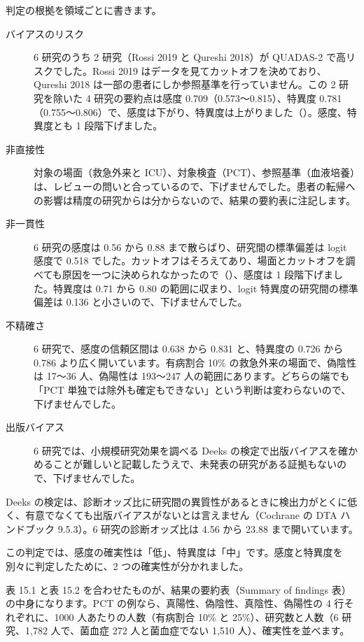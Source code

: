 判定の根拠を領域ごとに書きます。

\begin{description}
\item[バイアスのリスク] 6 研究のうち 2 研究（Rossi 2019 と Qureshi 2018）が QUADAS-2 で高リスクでした。Rossi 2019 はデータを見てカットオフを決めており、Qureshi 2018 は一部の患者にしか参照基準を行っていません。この 2 研究を除いた 4 研究の要約点は感度 0.709（0.573〜0.815）、特異度 0.781（0.755〜0.806）で、感度は下がり、特異度は上がりました（）。感度、特異度とも 1 段階下げました。
\item[非直接性] 対象の場面（救急外来と ICU）、対象検査（PCT）、参照基準（血液培養）は、レビューの問いと合っているので、下げませんでした。患者の転帰への影響は精度の研究からは分からないので、結果の要約表に注記します。
\item[非一貫性] 6 研究の感度は 0.56 から 0.88 まで散らばり、研究間の標準偏差は logit 感度で 0.518 でした。カットオフはそろえてあり、場面とカットオフを調べても原因を一つに決められなかったので（）、感度は 1 段階下げました。特異度は 0.71 から 0.80 の範囲に収まり、logit 特異度の研究間の標準偏差は 0.136 と小さいので、下げませんでした。
\item[不精確さ] 6 研究で、感度の信頼区間は 0.638 から 0.831 と、特異度の 0.726 から 0.786 より広く開いています。有病割合 10\% の救急外来の場面で、偽陰性は 17〜36 人、偽陽性は 193〜247 人の範囲にあります。どちらの端でも「PCT 単独では除外も確定もできない」という判断は変わらないので、下げませんでした。
\item[出版バイアス] 6 研究では、小規模研究効果を調べる Deeks の検定で出版バイアスを確かめることが難しいと記載したうえで、未発表の研究がある証拠もないので、下げませんでした。
\end{description}

\begin{hattenbox}
Deeks の検定は、診断オッズ比に研究間の異質性があるときに検出力がとくに低く、有意でなくても出版バイアスがないとは言えません（Cochrane の DTA ハンドブック 9.5.3）。6 研究の診断オッズ比は 4.56 から 23.88 まで開いています。
\end{hattenbox}

この判定では、感度の確実性は「低」、特異度は「中」です。感度と特異度を別々に判定したために、2 つの確実性が分かれました。

表 15.1 と表 15.2 を合わせたものが、結果の要約表（Summary of findings 表）の中身になります。PCT の例なら、真陽性、偽陰性、真陰性、偽陽性の 4 行それぞれに、1000 人あたりの人数（有病割合 10\% と 25\%）、研究数と人数（6 研究、1,782 人で、菌血症 272 人と菌血症でない 1,510 人）、確実性を並べます。

